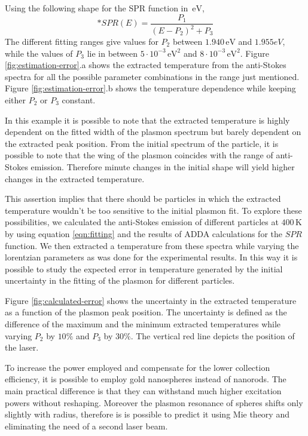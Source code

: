 \documentclass[journal=nalefd,manuscript=letter]{achemso}
\newcommand{\K}{\ensuremath{\,\textrm{K}}}
\newcommand{\eV}{\ensuremath{\,\textrm{eV}}}
\begin{document}
Using the following shape for the SPR function in $\eV$, \begin{equation}*
SPR(E) = \frac{P_1}{(E-P_2)^2+P_3}
\end{equation}
The different fitting ranges give values for $P_2$ between $1.940\eV$ and
$1.955eV$, while the values of $P_3$ lie in between $5\cdot10^{-3}\eV^2$ and
$8\cdot10^{-3}\eV^2$. Figure \ref{fig:estimation-error}.a shows the extracted
temperature from the anti-Stokes spectra for all the possible parameter
combinations in the range just mentioned. Figure \ref{fig:estimation-error}.b
shows the temperature dependence while keeping either $P_2$ or $P_3$ constant.

In this example it is possible to note that the extracted temperature is highly
dependent on the fitted width of the plasmon spectrum but barely dependent on
the extracted peak position. From the initial spectrum of the particle, it is
possible to note that the wing of the plasmon coincides with the range of
anti-Stokes emission. Therefore minute changes in the initial shape will yield
higher changes in the extracted temperature.

This assertion implies that there should be particles in which the extracted
temperature wouldn't be too sensitive to the initial plasmon fit. To explore
these possibilities, we calculated the anti-Stokes emission of different
particles at $400\K$ by using equation \ref{eqn:fitting} and the results of ADDA
calculations for the $SPR$ function. We then extracted a temperature from these
spectra while varying the lorentzian parameters as was done for the experimental
results. In this way it is possible to study the expected error in temperature
generated by the initial uncertainty in the fitting of the plasmon for different
particles. 

Figure \ref{fig:calculated-error} shows the uncertainty in the extracted
temperature as a function of the plasmon peak position. The uncertainty is
defined as the difference of the maximum and the minimum extracted temperatures
while varying $P_2$ by $10\%$ and $P_3$ by $30\%$. The vertical red line depicts
the position of the laser.




To increase the power employed and compensate for the lower collection
efficiency, it is possible to employ gold nanospheres instead of nanorods. The
main practical difference is that they can withstand much higher excitation
powers without reshaping. Moreover the plasmon resonance of spheres shifts only
slightly with radius, therefore is is possible to predict it using
Mie theory and eliminating the need of a second laser beam. 
\end{document}
